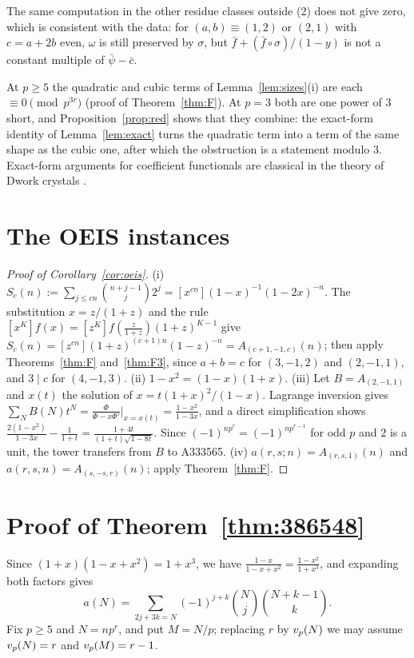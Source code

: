 \documentclass[11pt]{amsart}
\begin{document}
The same computation in the other residue classes outside (2) does not give zero, which is consistent with the data: for $(a,b)\equiv(1,2)$ or $(2,1)$ with $c=a+2b$ even, $\omega$ is still preserved by $\sigma$, but $\bar f+(\bar f\circ\sigma)/(1-y)$ is not a constant multiple of $\bar\psi-\bar c$.

\begin{remark}\label{rem:p3}
At $p\ge5$ the quadratic and cubic terms of Lemma~\ref{lem:sizes}(i) are each $\equiv0\pmod{p^{3r}}$ (proof of Theorem~\ref{thm:F}). At $p=3$ both are one power of $3$ short, and Proposition~\ref{prop:red} shows that they combine: the exact-form identity of Lemma~\ref{lem:exact} turns the quadratic term into a term of the same shape as the cubic one, after which the obstruction is a statement modulo $3$. Exact-form arguments for coefficient functionals are classical in the theory of Dwork crystals \cite{bv3}.
\end{remark}

\section{The OEIS instances}\label{sec:instances}

\begin{proof}[Proof of Corollary~\ref{cor:oeis}]
(i) $S_c(n):=\sum_{j\le cn}\binom{n+j-1}j2^j=[x^{cn}](1-x)^{-1}(1-2x)^{-n}$. The substitution $x=z/(1+z)$ and the rule $[x^K]f(x)=[z^K]f(\frac z{1+z})(1+z)^{K-1}$ give $S_c(n)=[z^{cn}](1+z)^{(c+1)n}(1-z)^{-n}=A_{(c+1,-1,c)}(n)$; then apply Theorems~\ref{thm:F} and~\ref{thm:F3}, since $a+b=c$ for $(3,-1,2)$ and $(2,-1,1)$, and $3\mid c$ for $(4,-1,3)$. (ii) $1-x^2=(1-x)(1+x)$. (iii) Let $B=A_{(2,-1,1)}$ and $x(t)$ the solution of $x=t(1+x)^2/(1-x)$. Lagrange inversion gives $\sum_NB(N)t^N=\frac{\Phi}{\Phi-x\Phi'}\big|_{x=x(t)}=\frac{1-x^2}{1-3x}$, and a direct simplification shows $\frac{2(1-x^2)}{1-3x}-\frac1{1+t}=\frac{1+4t}{(1+t)\sqrt{1-8t}}$. Since $(-1)^{np^r}=(-1)^{np^{r-1}}$ for odd $p$ and $2$ is a unit, the tower transfers from $B$ to A333565. (iv) $a(r,s;n)=A_{(r,s,1)}(n)$ and $a(r,s,n)=A_{(s,-s,r)}(n)$; apply Theorem~\ref{thm:F}.
\end{proof}

\section{Proof of Theorem~\ref{thm:386548}}\label{sec:386548}

Since $(1+x)(1-x+x^2)=1+x^3$, we have $\frac{1-x}{1-x+x^2}=\frac{1-x^2}{1+x^3}$, and expanding both factors gives
\begin{equation}\label{eq:386}
a(N)=\sum_{2j+3k=N}(-1)^{j+k}\binom Nj\binom{N+k-1}k.
\end{equation}
Fix $p\ge5$ and $N=np^r$, and put $M=N/p$; replacing $r$ by $v_p(N)$ we may assume $v_p(N)=r$ and $v_p(M)=r-1$.
\end{document}
